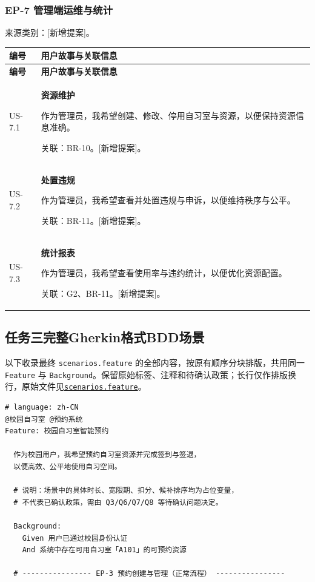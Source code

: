 \documentclass[11pt,a4paper]{article}
\begin{document}
\subsubsection{EP-7 管理端运维与统计}
来源类别：[新增提案]。

\begin{longtable}{@{}p{}p{}@{}}
    \toprule
    \textbf{编号} & \textbf{用户故事与关联信息} \\
    \midrule
    \endfirsthead
    \toprule
    \textbf{编号} & \textbf{用户故事与关联信息} \\
    \midrule
    \endhead
    \bottomrule
    \endlastfoot
    US-7.1 & \textbf{资源维护}\par 作为管理员，我希望创建、修改、停用自习室与资源，以便保持资源信息准确。\par {\small 关联：BR-10。[新增提案]。} \\
    \midrule
    US-7.2 & \textbf{处置违规}\par 作为管理员，我希望查看并处置违规与申诉，以便维持秩序与公平。\par {\small 关联：BR-11。[新增提案]。} \\
    \midrule
    US-7.3 & \textbf{统计报表}\par 作为管理员，我希望查看使用率与违约统计，以便优化资源配置。\par {\small 关联：G2、BR-11。[新增提案]。} \\
\end{longtable}

\subsection{任务三完整Gherkin格式BDD场景}\label{app:agentic-bdd}
以下收录最终 \texttt{scenarios.feature} 的全部内容，按原有顺序分块排版，共用同一 \texttt{Feature} 与 \texttt{Background}。保留原始标签、注释和待确认政策；长行仅作排版换行，原始文件见\href{run:task3/output/scenarios.feature}{\texttt{scenarios.feature}}。

\begin{framed}
\small
\begin{verbatim}
# language: zh-CN
@校园自习室 @预约系统
Feature: 校园自习室智能预约

  作为校园用户，我希望预约自习室资源并完成签到与签退，
  以便高效、公平地使用自习空间。

  # 说明：场景中的具体时长、宽限期、扣分、候补排序均为占位变量，
  # 不代表已确认政策，需由 Q3/Q6/Q7/Q8 等待确认问题决定。

  Background:
    Given 用户已通过校园身份认证
    And 系统中存在可用自习室「A101」的可预约资源

  # ---------------- EP-3 预约创建与管理（正常流程） ----------------
\end{verbatim}
\end{framed}
\end{document}
